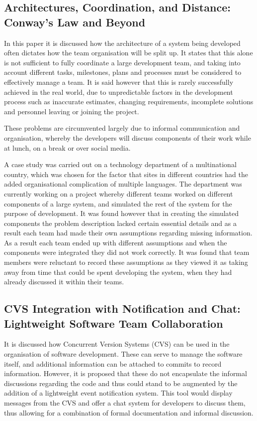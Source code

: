\documentclass{l4proj}
\begin{document}
\subsection{Architectures, Coordination, and Distance: Conway's Law and Beyond}

In this paper it is discussed how the architecture of a system being developed often dictates how the team organisation will be split up.  It states that this alone is not sufficient to fully coordinate a large development team, and taking into account different tasks, milestones, plans and processes must be considered to effectively manage a team.  It is said however that this is rarely successfully achieved in the real world, due to unpredictable factors in the development process such as inaccurate estimates, changing requirements, incomplete solutions and personnel leaving or joining the project.  

These problems are circumvented largely due to informal communication and organisation, whereby the developers will discuss components of their work while at lunch, on a break or over social media.

A case study was carried out on a technology department of a multinational country, which was chosen for the factor that sites in different countries had the added organisational complication of multiple languages.  The department was currently working on a project whereby different teams worked on different components of a large system, and simulated the rest of the system for the purpose of development.  It was found however that in creating the simulated components the problem description lacked certain essential details and as a result each team had made their own assumptions regarding missing information.  As a result each team ended up with different assumptions and when the components were integrated they did not work correctly.  It was found that team members were reluctant to record these assumptions as they viewed it as taking away from time that could be spent developing the system, when they had already discussed it within their teams.

\subsection {CVS Integration with Notification and Chat: Lightweight Software Team Collaboration}

It is discussed how Concurrent Version Systems (CVS) can be used in the organisation of software development. These can serve to manage the software itself, and additional information can be attached to commits to record information.  However, it is proposed that these do not encapsulate the informal discussions regarding the code and thus could stand to be augmented by the addition of a lightweight event notification system.  This tool would display messages from the CVS and offer a chat system for developers to discuss them, thus allowing for a combination of formal documentation and informal discussion.
\end{document}

